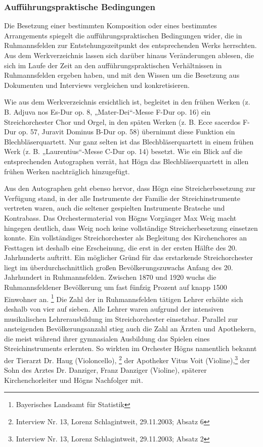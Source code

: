 \subsubsection{Aufführungspraktische Bedingungen}

\hypertarget{RefHeadingToc100333744}{}Die Besetzung einer bestimmten
Komposition oder eines bestimmtes Arrangements spiegelt die
aufführungspraktischen Bedingungen wider, die in Ruhmannsfelden zur
Entstehungszeitpunkt des entsprechenden Werks herrschten. Aus dem
Werkverzeichnis lassen sich darüber hinaus Veränderungen ablesen, die
sich im Laufe der Zeit an den aufführungspraktischen Verhältnissen in
Ruhmannsfelden ergeben haben, und mit den Wissen um die Besetzung aus
Dokumenten und Interviews vergleichen und konkretisieren.

Wie aus dem Werkverzeichnis ersichtlich ist, begleitet in den frühen
Werken (z. B. Adjuva nos Es-Dur op. 8, „Mater-Dei“-Messe F-Dur op. 16)
ein Streichorchester Chor und Orgel, in den späten Werken (z. B. Ecce
sacerdos F-Dur op. 57, Juravit Dominus B-Dur op. 58) übernimmt diese
Funktion ein Blechbläserquartett. Nur ganz selten ist das
Blechbläserquartett in einem frühen Werk (z. B. „Laurentius“-Messe
C-Dur op. 14) besetzt. Wie ein Blick auf die entsprechenden Autographen
verrät, hat Högn das Blechbläserquartett in allen frühen Werken
nachträglich hinzugefügt.

Aus den Autographen geht ebenso hervor, dass Högn eine
Streicherbesetzung zur Verfügung stand, in der alle Instrumente der
Familie der Streichinstrumente vertreten waren, auch die seltener
gespielten Instrumente Bratsche und Kontrabass. Das Orchestermaterial
von Högns Vorgänger Max Weig macht hingegen deutlich, dass Weig noch
keine vollständige Streicherbesetzung einsetzen konnte. Ein
vollständiges Streichorchester als Begleitung des Kirchenchores an
Festtagen ist deshalb eine Erscheinung, die erst in der ersten Hälfte
des 20. Jahrhunderts auftritt. Ein möglicher Gründ für das erstarkende
Streichorchester liegt im überdurchschnittlich großen
Bevölkerungszuwachs Anfang des 20. Jahrhundert in Ruhmannsfelden.
Zwischen 1870 und 1920 wuchs die Ruhmannsfeldener Bevölkerung um fast
fünfzig Prozent auf knapp 1500 Einwohner an. \footnote{Bayerisches
Landsamt für Statistik} Die Zahl der in Ruhmannsfelden tätigen Lehrer
erhöhte sich deshalb von vier auf sieben. Alle Lehrer waren aufgrund
der intensiven musikalischen Lehrerausbildung im Streichorchester
einsetzbar. Parallel zur ansteigenden Bevölkerungsanzahl stieg auch die
Zahl an Ärzten und Apothekern, die meist während ihrer gymnasialen
Ausbildung das Spielen eines Streichinstruments erlernten. So wirkten
im Orchester Högns namentlich bekannt der Tierarzt Dr. Haug
(Violoncello), \footnote{Interview Nr. 13, Lorenz Schlagintweit,
29.11.2003; Absatz 6} der Apotheker Vitus Voit (Violine),\footnote{
Interview Nr. 13, Lorenz Schlagintweit, 29.11.2003; Absatz 2} der Sohn
des Arztes Dr. Danziger, Franz Danziger (Violine), späterer
Kirchenchorleiter und Högns Nachfolger mit.


